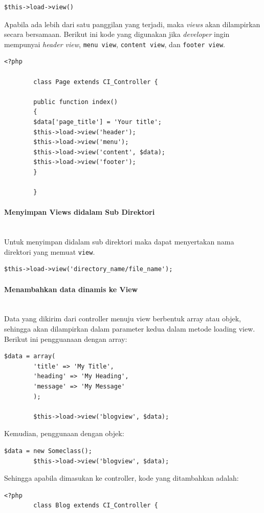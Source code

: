 \documentclass[a4paper,twoside]{article}
\newcommand{\myparagraph}[1]{\paragraph{#1}\mbox{}\\}
\begin{document}
\begin{enumerate}
		\begin{lstlisting}[frame=single] 
		$this->load->view()
		\end{lstlisting}
		
		Apabila ada lebih dari satu panggilan yang terjadi, maka \textit{views} akan dilampirkan secara bersamaan. Berikut ini kode yang digunakan jika \textit{developer} ingin mempunyai \textit{header view}, \texttt{menu view}, \texttt{content view}, dan \texttt{footer view}. 
		
		
		\begin{lstlisting}[frame=single] 
		<?php
		
		class Page extends CI_Controller {
		
		public function index()
		{
		$data['page_title'] = 'Your title';
		$this->load->view('header');
		$this->load->view('menu');
		$this->load->view('content', $data);
		$this->load->view('footer');
		}
		
		}
		\end{lstlisting}
		
		\myparagraph{Menyimpan Views didalam Sub Direktori}
		
		Untuk menyimpan didalam sub direktori maka dapat menyertakan nama direktori yang memuat \texttt{view}.
		\begin{lstlisting}[frame=single] 
		$this->load->view('directory_name/file_name');
		\end{lstlisting}
		
		\myparagraph{Menambahkan data dinamis ke View}
		
		Data yang dikirim dari controller menuju view berbentuk array atau objek, sehingga akan dilampirkan dalam parameter kedua dalam metode loading view.
		Berikut ini pengguanaan dengan array:
		\begin{lstlisting}[frame=single] 
		$data = array(
		'title' => 'My Title',
		'heading' => 'My Heading',
		'message' => 'My Message'
		);
		
		$this->load->view('blogview', $data);
		\end{lstlisting}
		
		\noindent Kemudian, penggunaan dengan objek:
		\begin{lstlisting}[frame=single] 
		$data = new Someclass();
		$this->load->view('blogview', $data);
		\end{lstlisting}
		
		\noindent Sehingga apabila dimasukan ke controller, kode yang ditambahkan adalah:
		\begin{lstlisting}[frame=single] 
		<?php
		class Blog extends CI_Controller {
		

\end{lstlisting}
\end{enumerate}
\end{document}
